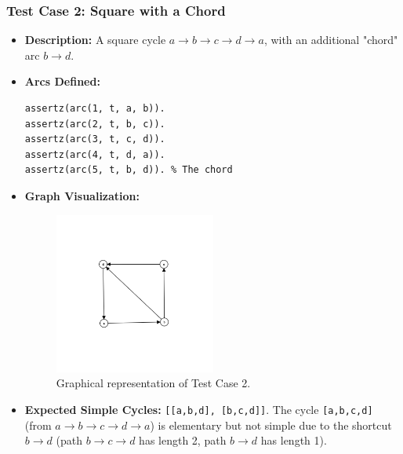 \documentclass[12pt,a4paper]{article}
\begin{document}
\subsubsection{Test Case 2: Square with a Chord}
\begin{itemize}
\item \textbf{Description:} A square cycle $a \rightarrow b \rightarrow c \rightarrow d \rightarrow a$, with an additional "chord" arc $b \rightarrow d$. 
\item \textbf{Arcs Defined:}
\begin{lstlisting}[style=prologstyle, basicstyle=\ttfamily\footnotesize]
assertz(arc(1, t, a, b)).
assertz(arc(2, t, b, c)).
assertz(arc(3, t, c, d)).
assertz(arc(4, t, d, a)).
assertz(arc(5, t, b, d)). % The chord
\end{lstlisting}
\item \textbf{Graph Visualization:}
\begin{figure}[H]
\centering
\includegraphics[width=0.5\textwidth]{Test2.png} %
\caption{Graphical representation of Test Case 2.}
\label{fig:testcase2}
\end{figure}
\item \textbf{Expected Simple Cycles:} \texttt{[[a,b,d], [b,c,d]]}. The cycle \texttt{[a,b,c,d]} (from $a \rightarrow b \rightarrow c \rightarrow d \rightarrow a$) is elementary but not simple due to the shortcut $b \rightarrow d$ (path $b \rightarrow c \rightarrow d$ has length 2, path $b \rightarrow d$ has length 1). 
\end{itemize}
\end{document}
